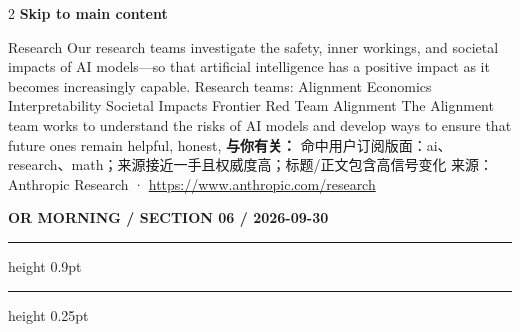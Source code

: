 \documentclass[10.5pt]{ctexart}
\begin{document}
\begin{multicols}{2}
\vspace{2mm}
{\large\bfseries Skip to main content}\par
Research Our research teams investigate the safety, inner workings, and societal impacts of AI models—so that artificial intelligence has a positive impact as it becomes increasingly capable. Research teams: Alignment Economics Interpretability Societal Impacts Frontier Red Team Alignment The Alignment team works to understand the risks of AI models and develop ways to ensure that future ones remain helpful, honest, 
\textbf{与你有关：} 命中用户订阅版面：ai、research、math；来源接近一手且权威度高；标题/正文包含高信号变化
{\footnotesize\color{ormuted} 来源：Anthropic Research · \url{https://www.anthropic.com/research}}
\end{multicols}
\newpage
{\small\bfseries OR MORNING / SECTION 06 / 2026-09-30}
\vspace{2mm}
\hrule height 0.9pt
\vspace{1.5mm}
\hrule height 0.25pt
\vspace{4mm}
\end{document}
